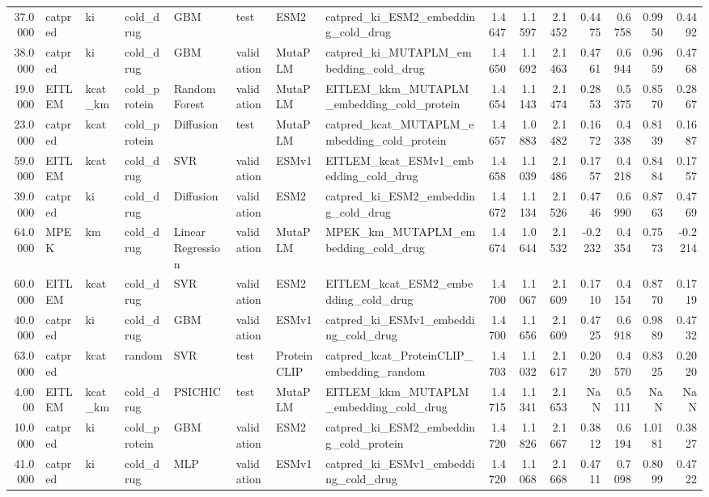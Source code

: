 \begin{tabular}{rlllllllrrrrrrr}
37.0000 & catpred & ki & cold_drug & GBM & test & ESM2 & catpred_ki_ESM2_embedding_cold_drug & 1.4647 & 1.1597 & 2.1452 & 0.4475 & 0.6758 & 0.9950 & 0.4492 \\
38.0000 & catpred & ki & cold_drug & GBM & validation & MutaPLM & catpred_ki_MUTAPLM_embedding_cold_drug & 1.4650 & 1.1692 & 2.1463 & 0.4761 & 0.6944 & 0.9659 & 0.4768 \\
19.0000 & EITLEM & kcat_km & cold_protein & Random Forest & validation & MutaPLM & EITLEM_kkm_MUTAPLM_embedding_cold_protein & 1.4654 & 1.1143 & 2.1474 & 0.2853 & 0.5375 & 0.8570 & 0.2867 \\
23.0000 & catpred & kcat & cold_protein & Diffusion & test & MutaPLM & catpred_kcat_MUTAPLM_embedding_cold_protein & 1.4657 & 1.0883 & 2.1482 & 0.1672 & 0.4338 & 0.8139 & 0.1687 \\
59.0000 & EITLEM & kcat & cold_drug & SVR & validation & ESMv1 & EITLEM_kcat_ESMv1_embedding_cold_drug & 1.4658 & 1.1039 & 2.1486 & 0.1757 & 0.4218 & 0.8484 & 0.1757 \\
39.0000 & catpred & ki & cold_drug & Diffusion & validation & ESM2 & catpred_ki_ESM2_embedding_cold_drug & 1.4672 & 1.1134 & 2.1526 & 0.4746 & 0.6990 & 0.8763 & 0.4769 \\
64.0000 & MPEK & km & cold_drug & Linear Regression & validation & MutaPLM & MPEK_km_MUTAPLM_embedding_cold_drug & 1.4674 & 1.0644 & 2.1532 & -0.2232 & 0.4354 & 0.7573 & -0.2214 \\
60.0000 & EITLEM & kcat & cold_drug & SVR & validation & ESM2 & EITLEM_kcat_ESM2_embedding_cold_drug & 1.4700 & 1.1067 & 2.1609 & 0.1710 & 0.4154 & 0.8770 & 0.1719 \\
40.0000 & catpred & ki & cold_drug & GBM & validation & ESMv1 & catpred_ki_ESMv1_embedding_cold_drug & 1.4700 & 1.1656 & 2.1609 & 0.4725 & 0.6918 & 0.9889 & 0.4732 \\
63.0000 & catpred & kcat & random & SVR & test & ProteinCLIP & catpred_kcat_ProteinCLIP_embedding_random & 1.4703 & 1.1032 & 2.1617 & 0.2020 & 0.4570 & 0.8325 & 0.2020 \\
4.0000 & EITLEM & kcat_km & cold_drug & PSICHIC & test & MutaPLM & EITLEM_kkm_MUTAPLM_embedding_cold_drug & 1.4715 & 1.1341 & 2.1653 & NaN & 0.5111 & NaN & NaN \\
10.0000 & catpred & ki & cold_protein & GBM & validation & ESM2 & catpred_ki_ESM2_embedding_cold_protein & 1.4720 & 1.1826 & 2.1667 & 0.3812 & 0.6194 & 1.0181 & 0.3827 \\
41.0000 & catpred & ki & cold_drug & MLP & validation & ESMv1 & catpred_ki_ESMv1_embedding_cold_drug & 1.4720 & 1.1068 & 2.1668 & 0.4711 & 0.7098 & 0.8099 & 0.4722 \\

\end{tabular}
